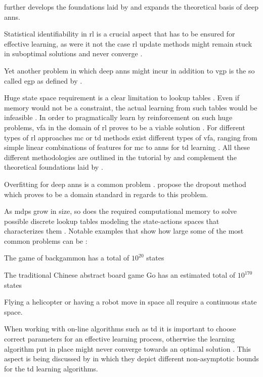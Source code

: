 \documentclass[draft=false]{seal_thesis}
\begin{document}
\citet{Bengio2009} further develops the foundations laid by \citet{Lecun1998} and expands the theoretical basis of deep \glspl{ann}.

Statistical identifiability in \gls{rl} is a crucial aspect that has to be ensured for effective learning, as were it not the case \gls{rl} update methods might remain stuck in suboptimal solutions and never converge \citep{Zhang2011}.

Yet another problem in which deep \glspl{ann} might incur in addition to \gls{vgp} is the so called \gls{egp} as defined by \citet{Pascanu2012}.

Huge state space requirement is a clear limitation to lookup tables \citep{Sutton2017}. Even if memory would not be a constraint, the actual learning from such tables would be infeasible \citep{Sutton2017}. In order to pragmatically learn by reinforcement on such huge problems, \gls{vfa} in the domain of \gls{rl} proves to be a viable solution \citep{Sutton2017}. For different types of \gls{rl} approaches \ie \gls{mc} or \gls{td} methods exist different types of \gls{vfa}, ranging from simple linear combinations of features for \gls{mc} to \glspl{ann} for \gls{td} learning \citep{Sutton2017}. All these different methodologies are outlined in the tutorial by \citet{Geramifard2013} and complement the theoretical foundations laid by \citet{Sutton2017}.

Overfitting for deep \glspl{ann} is a common problem \citep[p. 218]{Sutton2017}. \citet{Srivastava2014} propose the dropout method which proves to be a domain standard in regards to this problem.

As \glspl{mdp} grow in size, so does the required computational memory to solve possible discrete lookup tables modeling the state-actions spaces that characterizes them \citep{Sutton2017}. Notable examples that show how large some of the most common problems can be \citep{Sutton2017}:
\begin{enumerate*}
	\item The game of backgammon has a total of $10^{20}$ states
	\item The traditional Chinese abstract board game Go has an estimated total of $10^{170}$ states
	\item Flying a helicopter or having a robot move in space all require a continuous state space.
\end{enumerate*}

When working with on-line algorithms such as \gls{td} it is important to choose correct parameters for an effective learning process, otherwise the learning algorithm put in place might never converge towards an optimal solution \citep{Sutton2017}. This aspect is being discussed by \citet{Korda2014} in which they depict different non-asymptotic bounds for the \gls{td} learning algorithms.
\end{document}
